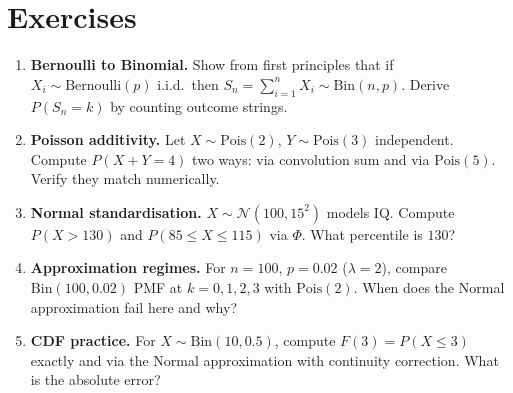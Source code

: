 \section{Exercises}
\label{sec:ch04-exercises}
\begin{enumerate}[label=E4.\arabic*, leftmargin=*, itemsep=0.8em]
\item \textbf{Bernoulli to Binomial.} Show from first principles that if $X_i\sim\mathrm{Bernoulli}(p)$ i.i.d.\ then $S_n=\sum_{i=1}^n X_i\sim\mathrm{Bin}(n,p)$. Derive $P(S_n=k)$ by counting outcome strings.
\item \textbf{Poisson additivity.} Let $X\sim\mathrm{Pois}(2)$, $Y\sim\mathrm{Pois}(3)$ independent. Compute $P(X+Y=4)$ two ways: via convolution sum and via $\mathrm{Pois}(5)$. Verify they match numerically.
\item \textbf{Normal standardisation.} $X\sim\mathcal{N}(100,15^2)$ models IQ. Compute $P(X>130)$ and $P(85\le X\le115)$ via $\Phi$. What percentile is $130$?
\item \textbf{Approximation regimes.} For $n=100$, $p=0.02$ ($\lambda=2$), compare $\mathrm{Bin}(100,0.02)$ PMF at $k=0,1,2,3$ with $\mathrm{Pois}(2)$. When does the Normal approximation fail here and why?
\item \textbf{CDF practice.} For $X\sim\mathrm{Bin}(10,0.5)$, compute $F(3)=P(X\le3)$ exactly and via the Normal approximation with continuity correction. What is the absolute error?
\end{enumerate}
